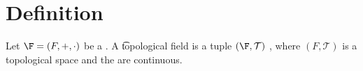 

\section*{Definition}

Let $\F  = (F, +, \cdot )$ be a .
A \t{topological field} is a tuple $(\F , \mathcal{T} )$ , where $(F, \mathcal{T} )$ is a topological space and the are continuous.
